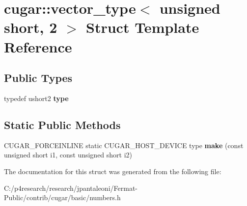 \hypertarget{structcugar_1_1vector__type_3_01unsigned_01short_00_012_01_4}{}\section{cugar\+:\+:vector\+\_\+type$<$ unsigned short, 2 $>$ Struct Template Reference}
\label{structcugar_1_1vector__type_3_01unsigned_01short_00_012_01_4}
\subsection*{Public Types}
\begin{DoxyCompactItemize}
\item 
\mbox{\label{structcugar_1_1vector__type_3_01unsigned_01short_00_012_01_4_a68f2e156f65f3d2f5b6b20497fddf36b}} 
typedef ushort2 {\bfseries type}
\end{DoxyCompactItemize}
\subsection*{Static Public Methods}
\begin{DoxyCompactItemize}
\item 
\mbox{\label{structcugar_1_1vector__type_3_01unsigned_01short_00_012_01_4_adfbce410f169e5761b35c75c782f6826}} 
C\+U\+G\+A\+R\+\_\+\+F\+O\+R\+C\+E\+I\+N\+L\+I\+NE static C\+U\+G\+A\+R\+\_\+\+H\+O\+S\+T\+\_\+\+D\+E\+V\+I\+CE type {\bfseries make} (const unsigned short i1, const unsigned short i2)
\end{DoxyCompactItemize}


The documentation for this struct was generated from the following file\+:\begin{DoxyCompactItemize}
\item 
C\+:/p4research/research/jpantaleoni/\+Fermat-\/\+Public/contrib/cugar/basic/numbers.\+h\end{DoxyCompactItemize}
